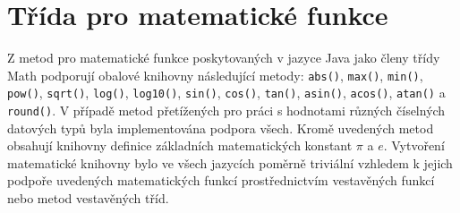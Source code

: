 \documentclass[onepage, a4paper, 12pt]{bakalarka}
\begin{document}
\section{Třída pro matematické funkce}
Z metod pro matematické funkce poskytovaných v jazyce Java jako členy třídy Math podporují obalové knihovny následující metody: \texttt{abs()}, \texttt{max()}, \texttt{min()}, \texttt{pow()}, \texttt{sqrt()}, \texttt{log()},  \texttt{log10()}, \texttt{sin()}, \texttt{cos()}, \texttt{tan()}, \texttt{asin()}, \texttt{acos()}, \texttt{atan()} a \texttt{round()}. V případě metod přetížených pro práci s hodnotami různých číselných datových typů byla implementována podpora všech. Kromě uvedených metod obsahují knihovny definice základních matematických konstant $\pi$ a $e$.
Vytvoření matematické knihovny bylo ve všech jazycích poměrně triviální vzhledem k jejich podpoře uvedených matematických funkcí prostřednictvím vestavěných funkcí nebo metod vestavěných tříd.
\end{document}

